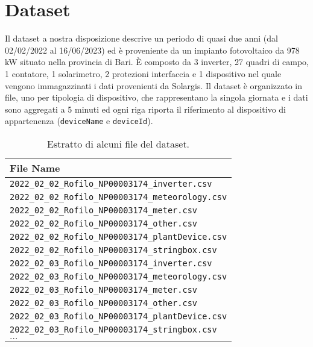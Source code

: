 \section{Dataset}

Il dataset a nostra disposizione descrive un periodo di quasi due anni (dal
02/02/2022 al 16/06/2023) ed è proveniente da un impianto fotovoltaico da 978 kW
situato nella provincia di Bari. È composto da
3 inverter, 27 quadri di campo, 1 contatore, 1 solarimetro, 2 protezioni
interfaccia e 1 dispositivo  nel quale vengono immagazzinati
i dati provenienti da Solargis. Il dataset è organizzato in file, uno per
tipologia di dispositivo, che
rappresentano la singola giornata e i dati sono aggregati a 5 minuti ed ogni
riga riporta il riferimento al
dispositivo di appartenenza (\verb|deviceName| e \verb|deviceId|).

\begin{table}[H]
    \begin{center}
        \begin{tabular}[c]{l}
            \hline
            \textbf{File Name}                                  \\
            \hline
            \verb|2022_02_02_Rofilo_NP00003174_inverter.csv|    \\
            \verb|2022_02_02_Rofilo_NP00003174_meteorology.csv| \\
            \verb|2022_02_02_Rofilo_NP00003174_meter.csv|       \\
            \verb|2022_02_02_Rofilo_NP00003174_other.csv|       \\
            \verb|2022_02_02_Rofilo_NP00003174_plantDevice.csv| \\
            \verb|2022_02_02_Rofilo_NP00003174_stringbox.csv|   \\
            \verb|2022_02_03_Rofilo_NP00003174_inverter.csv|    \\
            \verb|2022_02_03_Rofilo_NP00003174_meteorology.csv| \\
            \verb|2022_02_03_Rofilo_NP00003174_meter.csv|       \\
            \verb|2022_02_03_Rofilo_NP00003174_other.csv|       \\
            \verb|2022_02_03_Rofilo_NP00003174_plantDevice.csv| \\
            \verb|2022_02_03_Rofilo_NP00003174_stringbox.csv|   \\
            $\ldots$                                            \\
            \hline
        \end{tabular}
    \end{center}
    \caption{Estratto di alcuni file del dataset.}\label{tab:datasunto}
\end{table}


